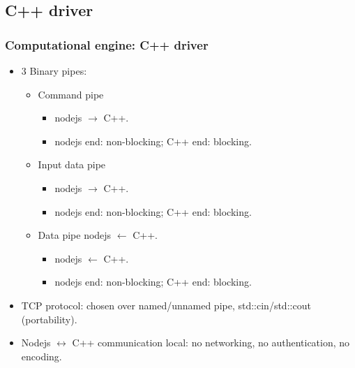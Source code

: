 \subsection{C++ driver}
\begin{frame}[fragile]
\frametitle{Computational engine: C++ driver}
\begin{itemize}
\item 3 Binary pipes: 
\begin{itemize}
\item Command pipe 
\begin{itemize}
\item nodejs $\longrightarrow$ C++. 
\item nodejs end: non-blocking; C++ end: blocking.
\end{itemize} 
\item Input data pipe
\begin{itemize}
\item nodejs $\longrightarrow$ C++.
\item nodejs end: non-blocking; C++ end: blocking.
\end{itemize} 
\item Data pipe nodejs $\leftarrow$ C++. 
\begin{itemize}
\item nodejs $\longleftarrow$ C++.
\item nodejs end: non-blocking; C++ end: blocking.
\end{itemize}
\end{itemize}
\item TCP protocol: chosen over named/unnamed pipe, std::cin/std::cout (portability).
\item Nodejs $\leftrightarrow$ C++ communication local: no networking, no authentication, no encoding.
\end{itemize}

\end{frame}

